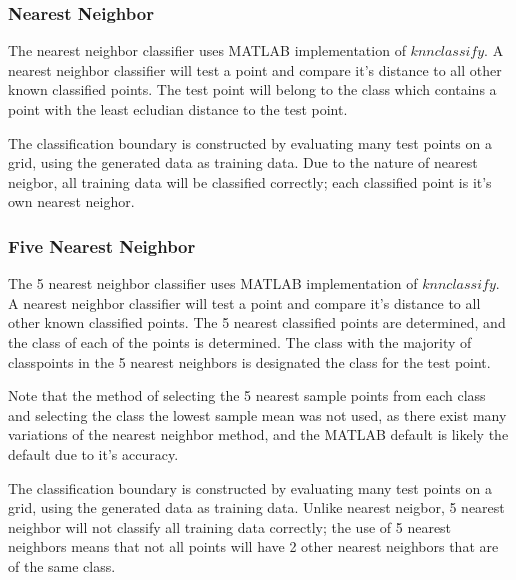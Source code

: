 \subsubsection{Nearest Neighbor}

The nearest neighbor classifier uses MATLAB implementation of $knnclassify$. A nearest neighbor classifier will test a point and compare it's distance to all other known classified points. The test point will belong to the class which contains a point with the least ecludian distance to the test point.

The classification boundary is constructed by evaluating many test points on a grid, using the generated data as training data. Due to the nature of nearest neigbor, all training data will be classified correctly; each classified point is it's own nearest neighor.

\subsubsection{Five Nearest Neighbor}

The 5 nearest neighbor classifier uses MATLAB implementation of $knnclassify$. A nearest neighbor classifier will test a point and compare it's distance to all other known classified points. The 5 nearest classified points are determined, and the class of each of the points is determined. The class with the majority of classpoints in the 5 nearest neighbors is designated the class for the test point.

Note that the method of selecting the 5 nearest sample points from each class and selecting the class the lowest sample mean was not used, as there exist many variations of the nearest neighbor method, and the MATLAB default is likely the default due to it's accuracy.

The classification boundary is constructed by evaluating many test points on a grid, using the generated data as training data. Unlike nearest neigbor, 5 nearest neighbor will not classify all training data correctly; the use of 5 nearest neighbors means that not all points will have 2 other nearest neighbors that are of the same class.
